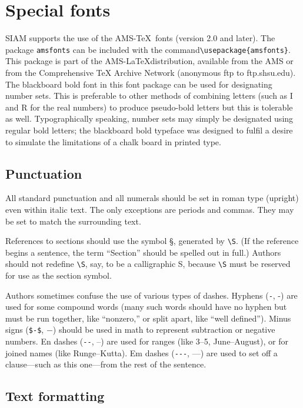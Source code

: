 \documentclass[final,leqno,onefignum,onetabnum]{siamltex1213}
\begin{document}
\section{Special fonts}

SIAM supports the use of the AMS-\TeX\ fonts (version 2.0
and later). The package \verb|amsfonts| can be included with
the command\linebreak \verb|\usepackage{amsfonts}|. This package
is part of the AMS-\LaTeX distribution, available
from the AMS or from the Comprehensive TeX Archive
Network (anonymous ftp to ftp.shsu.edu). The blackboard bold font in this
font package can be used for designating number sets. 
This is preferable to other methods of combining letters
(such as I and R for the real numbers) to produce pseudo-bold
letters but this is tolerable as well. Typographically speaking,
number sets may simply be designated using regular bold letters; 
the blackboard bold typeface was designed to fulfil a desire
to simulate the limitations of a chalk board in printed type.


\subsection{Punctuation}
All standard punctuation and all numerals should be set in roman type
(upright) even within italic text. The only exceptions are periods and 
commas. They may be set to match the surrounding text.

References to sections should use the symbol \S, generated by
\verb|\S|. (If the reference begins a sentence, the term ``Section''
should be spelled out in full.) Authors should not redefine
\verb|\S|, say, to be a calligraphic S, because \verb|\S|
must be reserved for use as the section symbol.  

Authors sometimes confuse the use of various types of dashes.
Hyphens (\verb|-|, -) are used for some compound words (many
such words should have no hyphen but must be run together, 
like ``nonzero,'' or split apart, like ``well defined''). 
Minus signs (\verb|$-$|, $-$)
should be used in math to represent subtraction or negative numbers.
En dashes (\verb|--|, --) are used for ranges (like 3--5, 
June--August), or for joined names (like Runge--Kutta). Em dashes
(\verb|---|, ---) are used to set off a clause---such as this 
one---from the rest of the sentence. 


\subsection{Text formatting}
\end{document}
